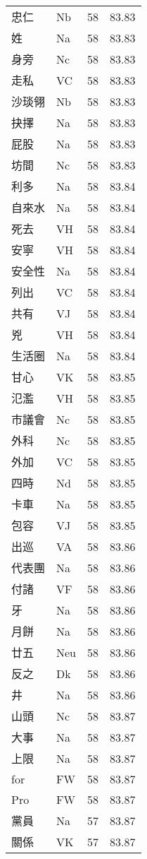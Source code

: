 \documentclass[twocolumn]{book}
\begin{document}
\begin{supertabular}{llrr}
忠仁 & Nb & 58 &  83.83\\
姓 & Na & 58 &  83.83\\
身旁 & Nc & 58 &  83.83\\
走私 & VC & 58 &  83.83\\
沙琰翎 & Nb & 58 &  83.83\\
抉擇 & Na & 58 &  83.83\\
屁股 & Na & 58 &  83.83\\
坊間 & Nc & 58 &  83.83\\
利多 & Na & 58 &  83.84\\
自來水 & Na & 58 &  83.84\\
死去 & VH & 58 &  83.84\\
安寧 & VH & 58 &  83.84\\
安全性 & Na & 58 &  83.84\\
列出 & VC & 58 &  83.84\\
共有 & VJ & 58 &  83.84\\
兇 & VH & 58 &  83.84\\
生活圈 & Na & 58 &  83.84\\
甘心 & VK & 58 &  83.85\\
氾濫 & VH & 58 &  83.85\\
市議會 & Nc & 58 &  83.85\\
外科 & Nc & 58 &  83.85\\
外加 & VC & 58 &  83.85\\
四時 & Nd & 58 &  83.85\\
卡車 & Na & 58 &  83.85\\
包容 & VJ & 58 &  83.85\\
出巡 & VA & 58 &  83.86\\
代表團 & Na & 58 &  83.86\\
付諸 & VF & 58 &  83.86\\
牙 & Na & 58 &  83.86\\
月餅 & Na & 58 &  83.86\\
廿五 & Neu & 58 &  83.86\\
反之 & Dk & 58 &  83.86\\
井 & Na & 58 &  83.86\\
山頭 & Nc & 58 &  83.87\\
大事 & Na & 58 &  83.87\\
上限 & Na & 58 &  83.87\\
for & FW & 58 &  83.87\\
Pro & FW & 58 &  83.87\\
黨員 & Na & 57 &  83.87\\
關係 & VK & 57 &  83.87\\

\end{supertabular}
\end{document}

